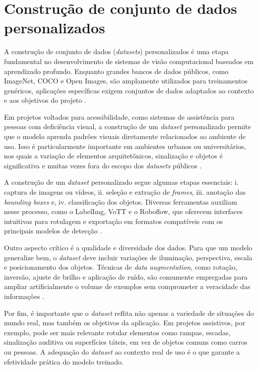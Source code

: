 \section{\textbf{Construção de conjunto de dados personalizados}}

A construção de conjunto de dados (\textit{datasets}) personalizados é uma etapa fundamental no desenvolvimento de sistemas de visão computacional baseados em aprendizado profundo. Enquanto grandes bancos de dados públicos, como ImageNet, COCO e Open Images, são amplamente utilizados para treinamentos genéricos, aplicações específicas exigem conjuntos de dados adaptados ao contexto e aos objetivos do projeto \cite{Zhou2017}.

Em projetos voltados para acessibilidade, como sistemas de assistência para pessoas com deficiência visual, a construção de um \textit{dataset} personalizado permite que o modelo aprenda padrões visuais diretamente relacionados ao ambiente de uso. Isso é particularmente importante em ambientes urbanos ou universitários, nos quais a variação de elementos arquitetônicos, sinalização e objetos é significativa e muitas vezes fora do escopo dos \textit{datasets} públicos \cite{Khan2021}.

A construção de um \textit{dataset} personalizado segue algumas etapas essenciais: i. captura de imagens ou vídeos, ii. seleção e extração de \textit{frames}, iii. anotação das \textit{bounding boxes} e, iv. classificação dos objetos. Diversas ferramentas auxiliam nesse processo, como o LabelImg, VoTT e o Roboflow, que oferecem interfaces intuitivas para rotulagem e exportação em formatos compatíveis com os principais modelos de detecção \cite{Tzutalin2015}.

Outro aspecto crítico é a qualidade e diversidade dos dados. Para que um modelo generalize bem, o \textit{dataset} deve incluir variações de iluminação, perspectiva, escala e posicionamento dos objetos. Técnicas de \textit{data augmentation}, como rotação, inversão, ajuste de brilho e aplicação de ruído, são comumente empregadas para ampliar artificialmente o volume de exemplos sem comprometer a veracidade das informações \cite{Shorten2019}.

Por fim, é importante que o \textit{dataset} reflita não apenas a variedade de situações do mundo real, mas também os objetivos da aplicação. Em projetos assistivos, por exemplo, pode ser mais relevante rotular elementos como rampas, escadas, sinalização auditiva ou superfícies táteis, em vez de objetos comuns como carros ou pessoas. A adequação do \textit{dataset} ao contexto real de uso é o que garante a efetividade prática do modelo treinado.


